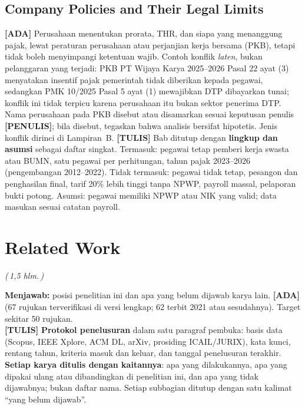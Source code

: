 \documentclass{ieeeaccess}
\newcommand{\ADA}{\textcolor{stada}{\textbf{[ADA]}}}
\newcommand{\TULIS}{\textcolor{sttulis}{\textbf{[TULIS]}}}
\newcommand{\PENULIS}{\textcolor{stpenulis}{\textbf{[PENULIS]}}}
\newcommand{\hal}[1]{\textcolor{draftblue}{\textit{(\,#1 hlm.\,)}}}
\newenvironment{isi}{\par\smallskip\footnotesize\color{draftblue}\noindent}{\par\smallskip\normalsize\color{black}}
\begin{document}
\subsection{Company Policies and Their Legal Limits}
\begin{isi}
\ADA{} Perusahaan menentukan prorata, THR, dan siapa yang menanggung pajak, lewat peraturan perusahaan atau perjanjian kerja bersama (PKB), tetapi tidak boleh menyimpangi ketentuan wajib. Contoh konflik \emph{laten}, bukan pelanggaran yang terjadi: PKB PT Wijaya Karya 2025--2026 Pasal 22 ayat (3) menyatakan insentif pajak pemerintah tidak diberikan kepada pegawai, sedangkan PMK 10/2025 Pasal 5 ayat (1) mewajibkan DTP dibayarkan tunai; konflik ini tidak terpicu karena perusahaan itu bukan sektor penerima DTP. Nama perusahaan pada PKB disebut atau disamarkan sesuai keputusan penulis \PENULIS{}; bila disebut, tegaskan bahwa analisis bersifat hipotetis. Jenis konflik dirinci di Lampiran~B. \TULIS{} Bab ditutup dengan \textbf{lingkup dan asumsi} sebagai daftar singkat. Termasuk: pegawai tetap pemberi kerja swasta atau BUMN, satu pegawai per perhitungan, tahun pajak 2023--2026 (pengembangan 2012--2022). Tidak termasuk: pegawai tidak tetap, pesangon dan penghasilan final, tarif 20\% lebih tinggi tanpa NPWP, payroll massal, pelaporan bukti potong. Asumsi: pegawai memiliki NPWP atau NIK yang valid; data masukan sesuai catatan payroll.
\end{isi}

\section{Related Work}
\label{sec:terkait}
\hal{1,5}
\begin{isi}
\textbf{Menjawab:} posisi penelitian ini dan apa yang belum dijawab karya lain. \ADA{} (67 rujukan terverifikasi di versi lengkap; 62 terbit 2021 atau sesudahnya). Target sekitar 50 rujukan.\\
\TULIS{} \textbf{Protokol penelusuran} dalam satu paragraf pembuka: basis data (Scopus, IEEE Xplore, ACM DL, arXiv, prosiding ICAIL/JURIX), kata kunci, rentang tahun, kriteria masuk dan keluar, dan tanggal penelusuran terakhir. \textbf{Setiap karya ditulis dengan kaitannya}: apa yang dilakukannya, apa yang dipakai ulang atau dibandingkan di penelitian ini, dan apa yang tidak dijawabnya; bukan daftar nama. Setiap subbagian ditutup dengan satu kalimat ``yang belum dijawab''.
\end{isi}
\end{document}
